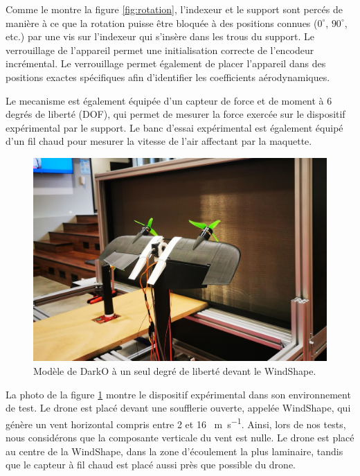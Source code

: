 Comme le montre la figure \ref{fig:rotation}, l'indexeur et le support sont percés de manière à ce que la rotation puisse être bloquée à des positions connues ($0^\circ$, $90^\circ$, etc.) par une vis sur l'indexeur qui s'insère dans les trous du support. Le verrouillage de l'appareil permet une initialisation correcte de l'encodeur incrémental. Le verrouillage permet également de placer l'appareil dans des positions exactes spécifiques afin d'identifier les coefficients aérodynamiques. 

Le mecanisme est également équipée d'un capteur de force et de moment à 6 degrés de liberté (DOF), qui permet de mesurer la force exercée sur le dispositif expérimental par le support. Le banc d'essai expérimental est également équipé d'un fil chaud pour mesurer la vitesse de l'air affectant par la maquette. 

\begin{figure}[!ht]
    \includegraphics[trim=0cm 5cm 0cm 6cm,clip,width=1\columnwidth]{figures/real_test_bench-min.jpg}
    \caption{Modèle de DarkO à un seul degré de liberté devant le WindShape.}
    \label{fig:real_test_bench}
\end{figure}
La photo de la figure \ref{fig:real_test_bench} montre le dispositif expérimental dans son environnement de test. Le drone est placé devant une soufflerie ouverte, appelée WindShape, qui génère un vent horizontal compris entre 2 et 16 \SI{}{\meter\per\second}. Ainsi, lors de nos tests, nous considérons que la composante verticale du vent est nulle. Le drone est placé au centre de la WindShape, dans la zone d'écoulement la plus laminaire, tandis que le capteur à fil chaud est placé aussi près que possible du drone. 

